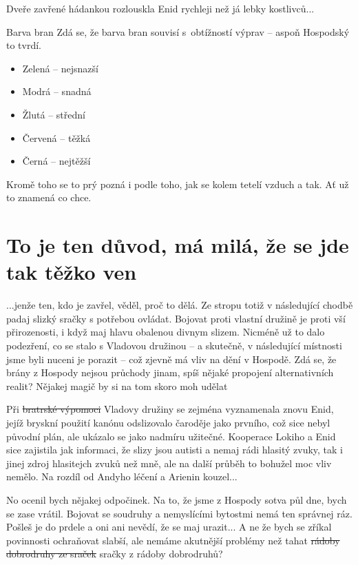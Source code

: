 \documentclass[a4paper,twocolumn,openany,nodeprecatedcode, justified]{dndbook}
\newcommand{\bi}{\begin{itemize}}
\newcommand{\ei}{\end{itemize}}
\begin{document}
	Dveře zavřené hádankou rozlouskla Enid rychleji než já lebky kostlivců...
	
	
	
	\begin{DndSidebar}{Barva bran}
		\sffamily
		Zdá se, že barva bran souvisí s~obtížností výprav -- aspoň Hospodský to tvrdí.
		\bi
			\item Zelená -- nejsnazší
			\item Modrá -- snadná
			\item Žlutá -- střední
			\item Červená -- těžká
			\item Černá -- nejtěžší
		\ei
		Kromě toho se to prý pozná i podle toho, jak se kolem tetelí vzduch a tak. Ať už to znamená co chce.
	\end{DndSidebar}
	
	\section[Sezení 2]{To je ten důvod, má milá, že se jde tak těžko ven}
	...jenže ten, kdo je zavřel, věděl, proč to dělá. Ze stropu totiž v následující chodbě padaj slizký sračky s potřebou ovládat. Bojovat proti vlastní družině je proti vší přirozenosti, i když maj hlavu obalenou divnym slizem. Nicméně už to dalo podezření, co se stalo s Vladovou družinou -- a skutečně, v následující místnosti jsme byli nuceni je porazit -- což zjevně má vliv na dění v Hospodě. Zdá se, že brány z Hospody nejsou průchody jinam, spíš nějaké propojení alternativních realit? Nějakej magič by si na tom skoro moh udělat 
	
	Při \sout{bratrské výpomoci}  Vladovy družiny se zejména vyznamenala znovu Enid, jejíž bryskní použití kanónu odslizovalo čaroděje jako prvního, což sice nebyl původní plán, ale ukázalo se jako nadmíru užitečné. Kooperace Lokiho a Enid sice zajistila jak informaci, že slizy jsou autisti a nemaj rádi hlasitý zvuky, tak i jinej zdroj hlasitejch zvuků než mně, ale na další průběh to bohužel moc vliv nemělo. Na rozdíl od Andyho léčení a Arienin kouzel...
	
	No ocenil bych nějakej odpočinek. Na to, že jsme z Hospody sotva půl dne, bych se zase vrátil. Bojovat se soudruhy a nemyslícími bytostmi nemá ten správnej ráz. Pošleš je do prdele a oni ani nevědí, že se maj urazit... A ne že bych se zříkal povinnosti ochraňovat slabší, ale nemáme akutnější problémy než tahat \sout{rádoby dobrodruhy ze sraček} sračky z rádoby dobrodruhů?
	
\end{document}
